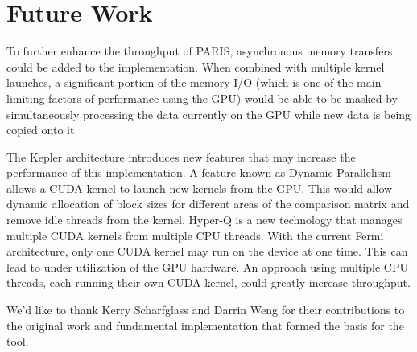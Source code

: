 \documentclass[smallextended]{svjour3}       %
\begin{document}

\section{Future Work}
\label{sec:future}
To further enhance the throughput of PARIS, asynchronous memory transfers could
be added to the implementation. When combined with multiple kernel launches, a
significant portion of the memory I/O (which is one of the main limiting
factors of performance using the GPU) would be able to be masked by
simultaneously processing the data currently on the GPU while new data is being
copied onto it.

The Kepler architecture introduces new features that may increase the 
performance of this implementation. A feature known as Dynamic Parallelism 
allows a CUDA kernel to launch new kernels from the GPU. This would allow
dynamic allocation of block sizes for different areas of the comparison matrix
and remove idle threads from the kernel. Hyper-Q is a new technology that
manages multiple CUDA kernels from multiple CPU threads. With the current Fermi
architecture, only one CUDA kernel may run on the device at one time. This can
lead to under utilization of the GPU hardware. An approach using multiple CPU
threads, each running their own CUDA kernel, could greatly increase throughput.

%
%
%


\begin{acknowledgements}
We'd like to thank Kerry Scharfglass and Darrin Weng for their contributions
to the original work \citep{scharfglass2012breaking} and fundamental
implementation that formed the basis for the tool.
\end{acknowledgements}

\end{document}
